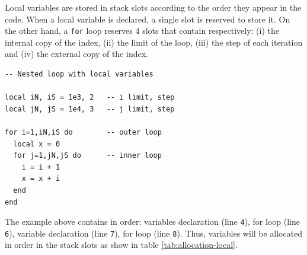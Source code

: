 Local variables are stored in stack slots according to the order they appear in the code. When a local variable is declared, a single slot is reserved to store it. On the other hand, a \texttt{for} loop reserves 4 slots that contain respectively: (i) the internal copy of the index, (ii) the limit of the loop, (iii) the step of each iteration and (iv) the external copy of the index. 
\begin{mdframed}[style=LuaStyleFrame]
\begin{lstlisting}[style=LuaStyle]
-- Nested loop with local variables

local iN, iS = 1e3, 2   -- i limit, step
local jN, jS = 1e4, 3   -- j limit, step

for i=1,iN,iS do        -- outer loop
  local x = 0
  for j=1,jN,jS do      -- inner loop
    i = i + 1
    x = x + i
  end
end
\end{lstlisting}
\end{mdframed}

\noindent
The example above contains in order: variables declaration (line \texttt{4}), for loop (line \texttt{6}), variable declaration (line \texttt{7}), for loop (line \texttt{8}). Thus, variables will be allocated in order in the stack slots as show in table \ref{tab:allocation-local}.

